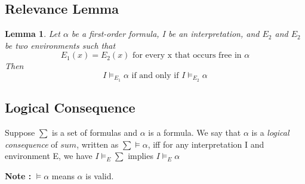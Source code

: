 \documentclass{article}
\newtheorem{lemma}[theorem]{Lemma}
\begin{document}
\subsection{Relevance Lemma}
\begin{lemma} Let \(\alpha\) be a first-order formula, I be an interpretation, and \(E_2\) and \(E_2\) be two environments such that 
$$ E_1 (x) = E_2 (x) \text{ for every x that occurs free in } \alpha $$
Then 
$$ I \models_{E_1} \alpha \text{ if and only if  } I \models_{E_2} \alpha$$
\end{lemma}

\subsection{Logical Consequence}
Suppose \(\sum\) is a set of formulas and \(\alpha\) is a formula. We say that \(\alpha\) is a \textit{logical consequence} of \(sum\), written as \(\sum \models \alpha\), iff for any interpretation I and environment E, we have \(I \models_E \sum\) implies \(I \models_E \alpha\)

\textbf{Note : } \(\models \alpha\) means \(\alpha\) is valid. 
\end{document}
